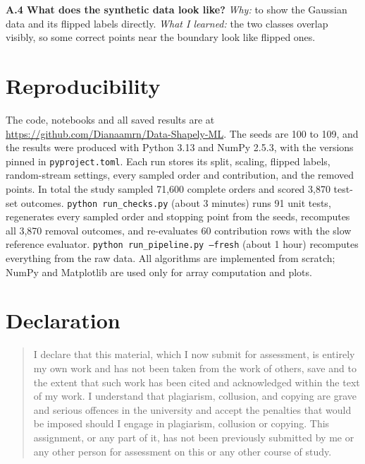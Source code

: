 \documentclass[10pt]{article}
\begin{document}
\textbf{A.4 What does the synthetic data look like?}
\emph{Why:} to show the Gaussian data and its flipped labels directly. \emph{What I learned:} the two classes overlap visibly, so some correct points near the boundary look like flipped ones.

\section*{Reproducibility}
The code, notebooks and all saved results are at \url{https://github.com/Dianaamrn/Data-Shapely-ML}. The seeds are 100 to 109, and the results were produced with Python 3.13 and NumPy 2.5.3, with the versions pinned in \texttt{pyproject.toml}. Each run stores its split, scaling, flipped labels, random-stream settings, every sampled order and contribution, and the removed points. In total the study sampled 71,600 complete orders and scored 3,870 test-set outcomes. \texttt{python run\_checks.py} (about 3 minutes) runs 91 unit tests, regenerates every sampled order and stopping point from the seeds, recomputes all 3,870 removal outcomes, and re-evaluates 60 contribution rows with the slow reference evaluator. \texttt{python run\_pipeline.py --fresh} (about 1 hour) recomputes everything from the raw data. All algorithms are implemented from scratch; NumPy and Matplotlib are used only for array computation and plots.


\section*{Declaration}
\begin{quote}\small
I declare that this material, which I now submit for assessment, is entirely my own work and has not been taken from the work of others, save and to the extent that such work has been cited and acknowledged within the text of my work. I understand that plagiarism, collusion, and copying are grave and serious offences in the university and accept the penalties that would be imposed should I engage in plagiarism, collusion or copying. This assignment, or any part of it, has not been previously submitted by me or any other person for assessment on this or any other course of study.
\end{quote}

\setlength{\bibsep}{3pt}


\end{document}
